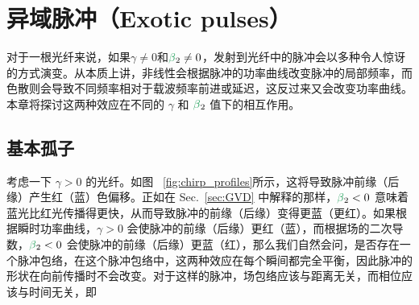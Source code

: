 \chapter{异域脉冲（Exotic pulses）}
\label{ch:Exotic}

对于一根光纤来说，如果$\gamma\neq 0$和$\betag_2\neq 0$，发射到光纤中的脉冲会以多种令人惊讶的方式演变。从本质上讲，非线性会根据脉冲的功率曲线改变脉冲的局部频率，而色散则会导致不同频率相对于载波频率前进或延迟，这反过来又会改变功率曲线。本章将探讨这两种效应在不同的 $\gamma$ 和 $\betag_2$ 值下的相互作用。

\section{基本孤子}
\label{sec:soliton}
考虑一下 $\gamma>0$ 的光纤。如图 ~\ref{fig:chirp_profiles}所示，这将导致脉冲前缘（后缘）产生红（蓝）色偏移。正如在 Sec.~\ref{sec:GVD} 中解释的那样，$\betag_2<0$ 意味着蓝光比红光传播得更快，从而导致脉冲的前缘（后缘）变得更蓝（更红）。如果根据瞬时功率曲线，$\gamma>0$ 会使脉冲的前缘（后缘）更红（蓝），而根据场的二次导数，$\betag_2<0$ 会使脉冲的前缘（后缘）更蓝（红），那么我们自然会问，是否存在一个脉冲包络，在这个脉冲包络中，这两种效应在每个瞬间都完全平衡，因此脉冲的形状在向前传播时不会改变。对于这样的脉冲，场包络应该与距离无关，而相位应该与时间无关，即

